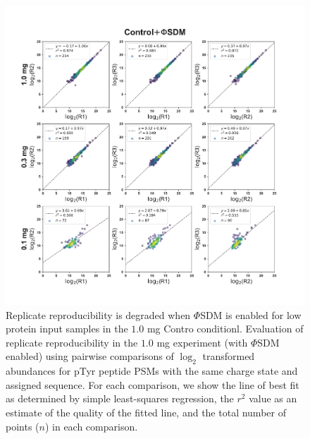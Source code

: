 \documentclass[journal=jprobs,manuscript=article]{achemso}
\begin{document}
\begin{figure}[t!]
\centering
\includegraphics[width=175mm]{figures/supplements/controlsdm_replicate_reprod.pdf}
\caption{Replicate reproducibility is degraded when $\Phi$SDM is enabled for low protein input samples in the $1.0$ mg Contro conditionl. Evaluation of replicate reproducibility in the $1.0$ mg experiment (with $\Phi$SDM enabled) using pairwise comparisons of $\log_2$ transformed abundances for  pTyr peptide PSMs with the same charge state and assigned sequence. For each comparison, we show the line of best fit as determined by simple least-squares regression\cite{grus2019data}, the $r^2$ value as an estimate of the quality of the fitted line, and the total number of points ($n$) in each comparison. }\label{controlsdm_replicate_reprod}
\end{figure}

\clearpage
\end{document}
